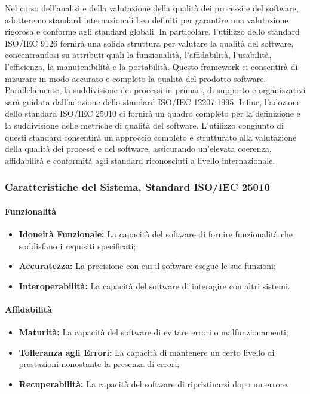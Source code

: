 Nel corso dell'analisi e della valutazione della qualità dei processi e del software, adotteremo standard internazionali ben definiti per garantire una valutazione rigorosa e conforme agli standard globali. In particolare, l'utilizzo dello standard ISO/IEC 9126 fornirà una solida struttura per valutare la qualità del software, concentrandosi su attributi quali la funzionalità, l'affidabilità, l'usabilità, l'efficienza, la manutenibilità e la portabilità. Questo framework ci consentirà di misurare in modo accurato e completo la qualità del prodotto software. Parallelamente, la suddivisione dei processi in primari, di supporto e organizzativi sarà guidata dall'adozione dello standard ISO/IEC 12207:1995. Infine, l'adozione dello standard ISO/IEC 25010 ci fornirà un quadro completo per la definizione e la suddivisione delle metriche di qualità del software.
L'utilizzo congiunto di questi standard consentirà un approccio completo e strutturato alla valutazione della qualità dei processi e del software, assicurando un'elevata coerenza, affidabilità e conformità agli standard riconosciuti a livello internazionale.

\subsubsection{Caratteristiche del Sistema, Standard ISO/IEC 25010}

\paragraph{Funzionalità}
\begin{itemize}
    \item \textbf{Idoneità Funzionale:} La capacità del software di fornire funzionalità che soddisfano i requisiti specificati;
    \item \textbf{Accuratezza:} La precisione con cui il software esegue le sue funzioni;
    \item \textbf{Interoperabilità:} La capacità del software di interagire con altri sistemi.
\end{itemize}

\paragraph{Affidabilità}
\begin{itemize}
    \item \textbf{Maturità:} La capacità del software di evitare errori o malfunzionamenti;
    \item \textbf{Tolleranza agli Errori:} La capacità di mantenere un certo livello di prestazioni nonostante la presenza di errori;
    \item \textbf{Recuperabilità:} La capacità del software di ripristinarsi dopo un errore.
\end{itemize}

